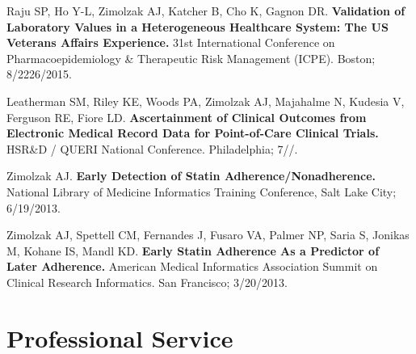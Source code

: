 \documentclass[10pt]{article}
\begin{document}
Raju SP, Ho Y-L, Zimolzak AJ, Katcher B, Cho K, Gagnon DR.
\textbf{Validation of Laboratory Values in a Heterogeneous Healthcare
  System: The US Veterans Affairs Experience.} 31st International
Conference on Pharmacoepidemiology \& Therapeutic Risk Management
(ICPE). Boston; 8/22\ndash{}26/2015.

Leatherman SM, Riley KE, Woods PA, Zimolzak AJ, Majahalme N, Kudesia
V, Ferguson RE, Fiore LD. \textbf{Ascertainment of Clinical Outcomes
  from Electronic Medical Record Data for Point-of-Care Clinical
  Trials.} HSR\&D / QUERI National Conference. Philadelphia;
7/\ndash{}/.

Zimolzak AJ. \textbf{Early Detection of Statin
  Adherence/Nonadherence.} National Library of Medicine Informatics
Training Conference, Salt Lake City; 6/19/2013.

Zimolzak AJ, Spettell CM, Fernandes J, Fusaro VA, Palmer NP, Saria S,
Jonikas M, Kohane IS, Mandl KD. \textbf{Early Statin Adherence As a
  Predictor of Later Adherence.} American Medical Informatics
Association Summit on Clinical Research Informatics. San Francisco;
3/20/2013.


\section*{Professional Service}
\end{document}
